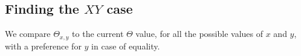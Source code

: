 \documentclass[aps]{revtex4}
\begin{document}
\subsection{Finding the $XY$ case}
We compare $\Theta_{x,y}$ to the current $\Theta$ value, for
all the possible values of $x$ and $y$, with a preference for $y$ in case of equality.
\end{document}
